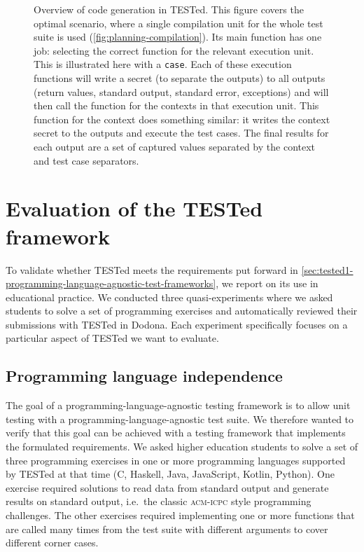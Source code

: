 \documentclass[../main]{subfiles}
\begin{document}
\begin{figure}
    \centering
    
    \caption{Overview of code generation in TESTed.
        This figure covers the optimal scenario, where a single compilation unit for the whole test suite is used (\cref{fig:planning-compilation}).
        Its main function has one job: selecting the correct function for the relevant execution unit.
        This is illustrated here with a \texttt{case}.
        Each of these execution functions will write a secret (to separate the outputs) to all outputs (return values, standard output, standard error, exceptions) and will then call the function for the contexts in that execution unit.
        This function for the context does something similar: it writes the context secret to the outputs and execute the test cases.
        The final results for each output are a set of captured values separated by the context and test case separators.
    }
    \label{fig:generated-code}
\end{figure}

\section{Evaluation of the TESTed framework}\label{sec:tested1-evaluating-tested}

To validate whether TESTed meets the requirements put forward in \cref{sec:tested1-programming-language-agnostic-test-frameworks}, we report on its use in educational practice.
We conducted three quasi-experiments where we asked students to solve a set of programming exercises and automatically reviewed their submissions with TESTed in Dodona.
Each experiment specifically focuses on a particular aspect of TESTed we want to evaluate.

\subsection{Programming language independence}\label{subsec:programming-language-independence}

The goal of a programming-language-agnostic testing framework is to allow unit testing with a programming-language-agnostic test suite.
We therefore wanted to verify that this goal can be achieved with a testing framework that implements the formulated requirements.
We asked higher education students to solve a set of three programming exercises in one or more programming languages supported by TESTed at that time (C, Haskell, Java, JavaScript, Kotlin, Python).
One exercise required solutions to read data from standard output and generate results on standard output, i.e.\ the classic \textsc{acm-icpc} style programming challenges.
The other exercises required implementing one or more functions that are called many times from the test suite with different arguments to cover different corner cases.
\end{document}

